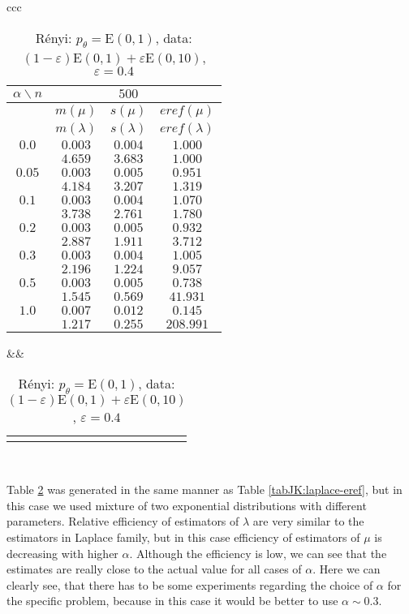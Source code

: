 {\begin{table}[htb] \footnotesize
\begin{center}
\begin{tabular}{ccc}
	\begin{tabular}{|c|ccc|} 
	\hline 
	$\alpha\backslash n$ && $500$ & \\ 
	\hline 
	& $m(\mu)$ & $s(\mu)$ & $eref(\mu)$ \\ 
	& $m(\lambda)$ & $s(\lambda)$ & $eref(\lambda)$ \\ 
	\hline 
	$0.0$ & $ 0.003 $ & $ 0.004 $ & $ 1.000 $\\ 
	 & $ 4.659 $ & $ 3.683 $ & $ 1.000 $\\ 
	\hline 
	$0.05$ & $ 0.003 $ & $ 0.005 $ & $ 0.951 $\\ 
	 & $ 4.184 $ & $ 3.207 $ & $ 1.319 $\\ 
	\hline 
	$0.1$ & $ 0.003 $ & $ 0.004 $ & $ 1.070 $\\ 
	 & $ 3.738 $ & $ 2.761 $ & $ 1.780 $\\ 
	\hline 
	$0.2$ & $ 0.003 $ & $ 0.005 $ & $ 0.932 $\\ 
	 & $ 2.887 $ & $ 1.911 $ & $ 3.712 $\\ 
	\hline 
	$0.3$ & $ 0.003 $ & $ 0.004 $ & $ 1.005 $\\ 
	 & $ 2.196 $ & $ 1.224 $ & $ 9.057 $\\ 
	\hline 
	$0.5$ & $ 0.003 $ & $ 0.005 $ & $ 0.738 $\\ 
	 & $ 1.545 $ & $ 0.569 $ & $ 41.931 $\\ 
	\hline 
	$1.0$ & $ 0.007 $ & $ 0.012 $ & $ 0.145 $\\ 
	 & $ 1.217 $ & $ 0.255 $ & $ 208.991 $\\ 
	\hline 
	\end{tabular}
&&
	\begin{tabular}{c}
		\epsfig{file=Exp-e04-eref.eps, height=2in} 
	\end{tabular}
\\
\end{tabular}
\end{center}
\caption{R\'{e}nyi: $p_\theta = \mathrm{E}(0,1)$, data: $(1-\varepsilon)\mathrm{E}(0,1) + \varepsilon \mathrm{E}(0,10)$, $\varepsilon =  0.4$} 
\label{tabJK:exponential-eref}
\end{table}

Table \ref{tabJK:exponential-eref} was generated in the same manner as Table \ref{tabJK:laplace-eref}, but in this case we used mixture of two exponential distributions with different parameters. Relative efficiency of estimators of $\lambda$ are very similar to the estimators in Laplace family, but in this case efficiency of estimators of $\mu$ is decreasing with higher $\alpha$. Although the efficiency is low, we can see that the estimates are really close to the actual value for all cases of $\alpha$. Here we can clearly see, that there has to be some experiments regarding the choice of $\alpha$ for the specific problem, because in this case it would be better to use $\alpha \sim 0.3$.

}
